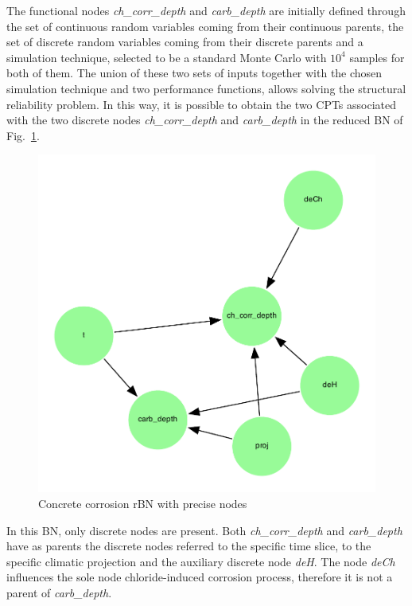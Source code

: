 The functional nodes \textit{ch\_corr\_depth} and \textit{carb\_depth} are initially defined through the set of continuous random variables coming from their continuous parents, the set of discrete random variables coming from their discrete parents and a simulation technique, selected to be a standard Monte Carlo with $10^4$ samples for both of them.
The union of these two sets of inputs together with the chosen simulation technique and two performance functions, allows solving the structural reliability problem. 
In this way, it is possible to obtain the two CPTs associated with the two discrete nodes \textit{ch\_corr\_depth} and \textit{carb\_depth} in the reduced BN of Fig.~\ref{fig:precise_rbn}. 

\begin{figure}[H]
    \centering
    \includegraphics[scale=0.5]{imgs/pdfs/13_total_rbn_precise.pdf}
    \caption{Concrete corrosion rBN with precise nodes}\label{fig:precise_rbn}
\end{figure}

In this BN, only discrete nodes are present. Both \textit{ch\_corr\_depth} and \textit{carb\_depth} have as parents the discrete nodes referred to the specific time slice, to the specific climatic projection and the auxiliary discrete node \textit{deH}. The node \textit{deCh} influences the sole node chloride-induced corrosion process, therefore it is not a parent of \textit{carb\_depth}.

